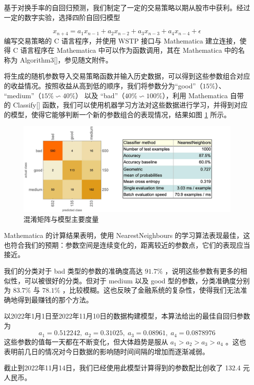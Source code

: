 \documentclass{ctexart}
\newcommand{\0}{\boldsymbol{0}}
\begin{document}
基于对换手率的自回归预测，我们制定了一定的交易策略以期从股市中获利。经过一定的数字实验，选择四阶自回归模型

\[
    x_{n+4} = a_1x_{n-1} + a_2x_{n-2} + a_3x_{n-3} + a_4x_{n-4} + \epsilon
\]
编写交易策略的 C 语言程序，并使用 WSTP 接口与 Mathematica 建立连接，使得 C 语言程序在 Mathematica 中可以作为函数调用，其在 Mathematica 中的名称为 Algorithm3[]，参见随文附件。

将生成的随机参数导入交易策略函数并输入历史数据，可以得到这些参数组合对应的收益情况。按照收益从高到低的顺序，我们将参数分为“good”（$15\%$）、 “medium”（$15\% \backsim 40\%$） 以及 “bad”（$40\% \backsim 100\%$），利用 Mathematica 自带的 Classify[] 函数，我们可以使用机器学习方法对这些数据进行学习，并得到对应的模型，使得它能够判断一个新的参数组合的表现情况，结果如图 \ref*{fig:learningresult} 所示。

\begin{figure}[ht]
    \centering
    \includegraphics[width=1\textwidth]{learningresult.jpeg}
    \caption{\kaishu 混淆矩阵与模型主要度量}
    \label{fig:learningresult}
\end{figure}

Mathematica 的计算结果表明，使用 NearestNeighbours 的学习算法表现最佳，这也符合我们的预期：参数空间是连续变化的，距离较近的参数点，它们的表现应当接近。

我们的分类对于 bad 类型的参数的准确度高达 $91.7\%$ ，说明这些参数有更多的相似性，可以被很好的分类。但对于 medium 以及 good 型的参数，分类准确度分别为 $83.7\%$ 与 $78.1\%$ ，比较模糊。这也反映了金融系统的复杂性，使得我们无法准确地得到最赚钱的那个方法。

以2022年1月1日至2022年11月10日的数据构建模型，本算法给出的最佳自回归参数为
\[
    a_1=0.512242,\;a_2=0.31025, \;a_3=0.08961 ,\;a_4=0.0878976
\]
这些参数的值每一天都在不断变化，但大体趋势是服从 $a_1>a_2>a_3>a_4$ 。这也表明前几日的情况对今日数据的影响随时间间隔的增加而逐渐减弱。


截止到2022年11月14日，我们已经使用此模型计算得到的参数配比创收了 132.4 元人民币。
\end{document}
